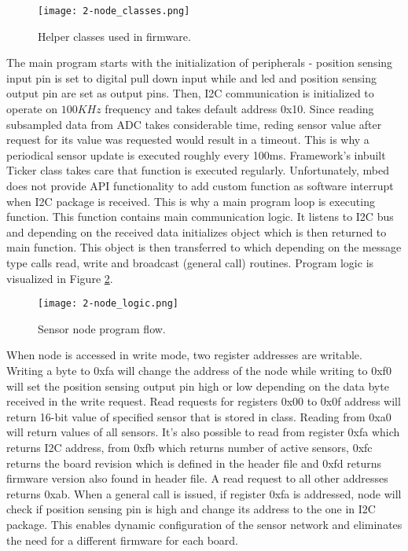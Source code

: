 \begin{figure}[h]
  \begin{center}
    \texttt{[image: 2-node\_classes.png]}
  \end{center}
  \caption{Helper classes used in firmware.}
  \label{fig:node_classes}
\end{figure}

The main program starts with the initialization of peripherals - position sensing input pin is set to digital pull down input while and led and position sensing output pin are set as output pins. Then, I2C communication is initialized to operate on $100KHz$ frequency and takes default address 0x10. Since reading subsampled data from \ac{ADC} takes considerable time, reding sensor value after request for its value was requested would result in a timeout. This is why a periodical sensor update is executed roughly every 100ms. Framework's inbuilt Ticker class takes care that function  is executed regularly. Unfortunately, mbed does not provide \ac{API} functionality to add custom function as software interrupt when I2C package is received. This is why a main program loop is executing  function. This function contains main communication logic. It listens to I2C bus and depending on the received data initializes  object which is then returned to main function. This object is then transferred to  which depending on the message type calls read, write and broadcast (general call) routines. Program logic is visualized in Figure \ref{fig:node_logic}.

\begin{figure}[h]
  \begin{center}
    \texttt{[image: 2-node\_logic.png]}
  \end{center}
  \caption{Sensor node program flow.}
  \label{fig:node_logic}
\end{figure}

When node is accessed in write mode, two register addresses are writable. Writing a byte to 0xfa will change the address of the node while writing to 0xf0 will set the position sensing output pin high or low depending on the data byte received in the write request. Read requests for registers 0x00 to 0x0f address will return 16-bit value of specified sensor that is stored in  class. Reading from 0xa0 will return values of all sensors. It's also possible to read from register 0xfa which returns I2C address, from 0xfb which returns number of active sensors, 0xfc returns the board revision which is defined in the header file and 0xfd returns firmware version also found in header file. A read request to all other addresses returns 0xab. When a general call is issued, if register 0xfa is addressed, node will check if position sensing pin is high and change its address to the one in \ac{I2C} package. This enables dynamic configuration of the sensor network and eliminates the need for a different firmware for each board. \\

